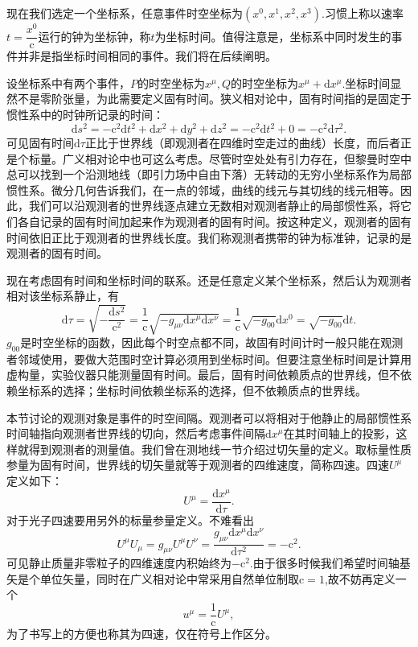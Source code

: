 \documentclass[11pt, a4paper, oneside, onecolumn]{ctexart}
\numberwithin{equation}{subsection}
\begin{document}
现在我们选定一个坐标系，任意事件时空坐标为$\left(x^{0},x^{1},x^{2},x^{3}\right)$.习惯上称以速率$t=\dfrac{x^{0}}{\mathrm{c}}$运行的钟为坐标钟，称$t$为坐标时间。值得注意是，坐标系中同时发生的事件并非是指坐标时间相同的事件。我们将在后续阐明。

设坐标系中有两个事件，$P$的时空坐标为$x^{\mu},Q$的时空坐标为$x^{\mu}+\mathrm{d}x^{\mu}$.坐标时间显然不是零阶张量，为此需要定义固有时间。狭义相对论中，固有时间指的是固定于惯性系中的时钟所记录的时间：
\begin{equation}
\mathrm{d}s^{2}=-\mathrm{c}^{2}\mathrm{d}t^{2}+\mathrm{d}x^{2}+\mathrm{d}y^{2}+\mathrm{d}z^{2}=-\mathrm{c}^{2}\mathrm{d}t^{2}+0=-\mathrm{c}^{2}\mathrm{d}\tau^{2}.
\end{equation}
可见固有时间$\mathrm{d}\tau$正比于世界线（即观测者在四维时空走过的曲线）长度，而后者正是个标量。广义相对论中也可这么考虑。尽管时空处处有引力存在，但黎曼时空中总可以找到一个沿测地线（即引力场中自由下落）无转动的无穷小坐标系作为局部惯性系。微分几何告诉我们，在一点的邻域，曲线的线元与其切线的线元相等。因此，我们可以沿观测者的世界线逐点建立无数相对观测者静止的局部惯性系，将它们各自记录的固有时间加起来作为观测者的固有时间。按这种定义，观测者的固有时间依旧正比于观测者的世界线长度。我们称观测者携带的钟为标准钟，记录的是观测者的固有时间。

现在考虑固有时间和坐标时间的联系。还是任意定义某个坐标系，然后认为观测者相对该坐标系静止，有
\begin{equation}
\mathrm{d}\tau=\sqrt{-\frac{\mathrm{d}s^{2}}{\mathrm{c}^{2}}}=\frac{1}{\mathrm{c}}\sqrt{-g_{\mu\nu}\mathrm{d}x^{\mu}\mathrm{d}x^{\nu}}=\frac{1}{\mathrm{c}}\sqrt{-g_{00}}\mathrm{d}x^{0}=\sqrt{-g_{00}}\mathrm{d}t.\label{2.1.2}
\end{equation}
$g_{00}$是时空坐标的函数，因此每个时空点都不同，故固有时间计时一般只能在观测者邻域使用，要做大范围时空计算必须用到坐标时间。但要注意坐标时间是计算用虚构量，实验仪器只能测量固有时间。最后，固有时间依赖质点的世界线，但不依赖坐标系的选择；坐标时间依赖坐标系的选择，但不依赖质点的世界线。

本节讨论的观测对象是事件的时空间隔。观测者可以将相对于他静止的局部惯性系时间轴指向观测者世界线的切向，然后考虑事件间隔$\mathrm{d}x^{\mu}$在其时间轴上的投影，这样就得到观测者的测量值。我们曾在测地线一节介绍过切矢量的定义。取标量性质参量为固有时间，世界线的切矢量就等于观测者的四维速度，简称四速。四速$U^{\mu}$定义如下：
\begin{equation}
U^{\mu}=\frac{\mathrm{d}x^{\mu}}{\mathrm{d}\tau}.
\end{equation}
对于光子四速要用另外的标量参量定义。不难看出
\begin{equation}
U^{\mu}U_{\mu}=g_{\mu\nu}U^{\mu}U^{\nu}=\frac{g_{\mu\nu}\mathrm{d}x^{\mu}\mathrm{d}x^{\nu}}{\mathrm{d}\tau^{2}}=-\mathrm{c}^{2}.
\end{equation}
可见静止质量非零粒子的四维速度内积始终为$-\mathrm{c}^{2}$.由于很多时候我们希望时间轴基矢是个单位矢量，同时在广义相对论中常采用自然单位制取$\mathrm{c}=1$,故不妨再定义一个
\begin{equation}
u^{\mu}=\frac{1}{\mathrm{c}}U^{\mu},
\end{equation}
为了书写上的方便也称其为四速，仅在符号上作区分。
\end{document}
